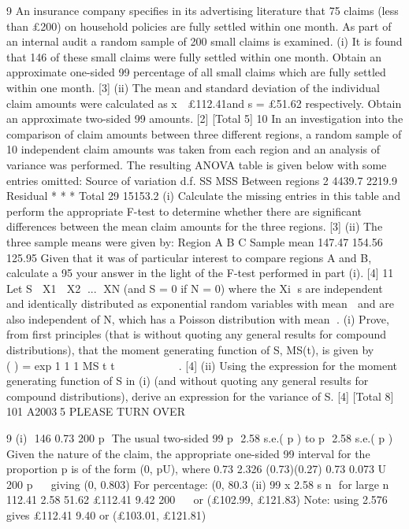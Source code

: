 
9 An insurance company specifies in its advertising literature that 75%
claims (less than £200) on household policies are fully settled within one month. As
part of an internal audit a random sample of 200 small claims is examined.
(i) It is found that 146 of these small claims were fully settled within one month.
Obtain an approximate one-sided 99%
percentage of all small claims which are fully settled within one month. [3]
(ii) The mean and standard deviation of the individual claim amounts were
calculated as x  £112.41and s = £51.62 respectively. Obtain an approximate
two-sided 99%
amounts. [2]
[Total 5]
10 In an investigation into the comparison of claim amounts between three different
regions, a random sample of 10 independent claim amounts was taken from each
region and an analysis of variance was performed. The resulting ANOVA table is
given below with some entries omitted:
Source of variation d.f. SS MSS
Between regions 2 4439.7 2219.9
Residual * * *
Total 29 15153.2
(i) Calculate the missing entries in this table and perform the appropriate F-test to
determine whether there are significant differences between the mean claim
amounts for the three regions. [3]
(ii) The three sample means were given by:
Region A B C
Sample mean 147.47 154.56 125.95
Given that it was of particular interest to compare regions A and B, calculate a
95%
your answer in the light of the F-test performed in part (i). [4]
11 Let S  X1  X2 ... XN (and S = 0 if N = 0) where the Xi s are independent and
identically distributed as exponential random variables with mean  and are also
independent of N, which has a Poisson distribution with mean .
(i) Prove, from first principles (that is without quoting any general results for
compound distributions), that the moment generating function of S, MS(t), is
given by    ( ) = exp 1 1 1 MS t t        	
. [4]
(ii) Using the expression for the moment generating function of S in (i) (and
without quoting any general results for compound distributions), derive an
expression for the variance of S. [4]
[Total 8]
101 A20035 PLEASE TURN OVER


9 (i)  146 0.73
200
p 
The usual two-sided 99%
p  2.58 s.e.( p ) to p  2.58 s.e.( p )
Given the nature of the claim, the appropriate one-sided 99%
interval for the proportion p is of the form (0, pU),
where 0.73 2.326 (0.73)(0.27) 0.73 0.073
U 200 p     giving (0, 0.803)
For percentage: (0, 80.3%
(ii) 99%
x 2.58 s
n
 for large n
112.41 2.58 51.62 £112.41 9.42
200
    or (£102.99, £121.83)
Note: using 2.576 gives £112.41 9.40 or (£103.01, £121.81)

